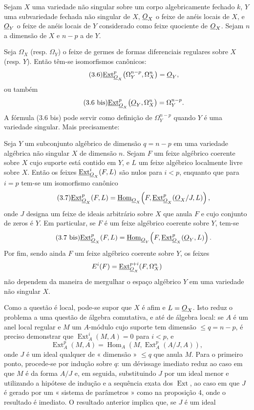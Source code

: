  Sejam $X$ uma variedade não singular sobre um corpo
algebricamente fechado $k$, $Y$ uma subvariedade fechada não singular de $X$,
$\underline{O}_X$ o feixe de anéis locais de $X$, e $\underline{O}_Y$ o feixe de anéis
locais de $Y$ considerado como feixe quociente de $\underline{O}_X$. Sejam $n$ a
dimensão de $X$ e $n-p$ a de $Y$.

Seja $\Omega_X$ (resp. $\Omega_Y$) o feixe de germes de formas
diferenciais regulares sobre $X$ (resp. $Y$). Então têm-se isomorfismos
canônicos:
\begin{equation}\tag{3.6}
  \underline{\operatorname{Ext}}_{\underline{O}_X}^{p}\bigl(\Omega_Y^{n-p},\Omega_X^{n}\bigr)=\underline{O}_Y,
\end{equation}
ou também
\begin{equation}\tag{3.6 bis}
  \underline{\operatorname{Ext}}_{\underline{O}_X}^{p}\bigl(\underline{O}_Y,\Omega_X^{n}\bigr)=\Omega_Y^{n-p}.
\end{equation}
A fórmula (3.6 bis) pode servir como definição de $\Omega_Y^{n-p}$ quando $Y$
é uma variedade singular. Mais precisamente:

 Seja $Y$ um subconjunto algébrico de dimensão
$q=n-p$ em uma variedade algébrica não singular $X$ de dimensão $n$. Sejam
$F$ um feixe algébrico coerente sobre $X$ cujo suporte está contido em $Y$, e $L$
um feixe algébrico localmente livre sobre $X$. Então os feixes
$\underline{\operatorname{Ext}}_{\underline{O}_X}^{i}(F,L)$ são nulos para $i<p$, enquanto que para $i=p$ tem-se um
isomorfismo canônico
\begin{equation}\tag{3.7}
  \underline{\operatorname{Ext}}_{\underline{O}_X}^{p}(F,L)
  =\underline{\operatorname{Hom}}_{\underline{O}_X}\!\left(F,
  \underline{\operatorname{Ext}}_{\underline{O}_X}^{p}(\underline{O}_X/J,L)\right),
\end{equation}
onde $J$ designa um feixe de ideais arbitrário sobre $X$ que anula $F$ e cujo
conjunto de zeros é $Y$. Em particular, se $F$ é um feixe algébrico
coerente sobre $Y$, tem-se
\begin{equation}\tag{3.7 bis}
  \underline{\operatorname{Ext}}_{\underline{O}_X}^{p}(F,L)
  =\underline{\operatorname{Hom}}_{\underline{O}_Y}\!\left(F,\underline{\operatorname{Ext}}_{\underline{O}_X}^{p}(\underline{O}_Y,L)\right).
\end{equation}
Por fim, sendo ainda $F$ um feixe algébrico coerente sobre $Y$, os feixes
\[
  E^{i}(F)=\underline{\operatorname{Ext}}_{\underline{O}_X}^{p+i}(F,\Omega_X^{n})
\]
não dependem da maneira de mergulhar o espaço algébrico $Y$ em uma variedade
não singular $X$.

Como a questão é local, pode-se supor que $X$ é afim e $L=\underline{O}_X$. Isto reduz
o problema a uma questão de álgebra comutativa, e até de álgebra local: se $A$ é um
anel local regular e $M$ um $A$-módulo cujo suporte tem dimensão
$\leq q=n-p$, é preciso demonstrar que $\operatorname{Ext}_{A}^{i}(M,A)=0$ para $i<p$, e
\[
  \operatorname{Ext}_{A}^{p}(M,A)
  =\operatorname{Hom}_{A}\!\left(M,\operatorname{Ext}_{A}^{p}(A/J,A)\right),
\]
onde $J$ é um ideal qualquer de « dimensão » $\leq q$ que anula $M$. Para o
primeiro ponto, procede-se por indução sobre $q$: um dévissage imediato reduz
ao caso em que $M$ é da forma $A/J$ e, em seguida, substituindo $J$ por um ideal menor
e utilizando a hipótese de indução e a sequência exata dos
$\operatorname{Ext}$, ao caso em que $J$ é gerado por um « sistema de parâmetros »
como na proposição 4, onde o resultado é imediato. O resultado
anterior implica que, se $J$ é um ideal

